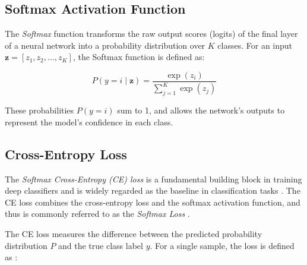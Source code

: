 

\subsection{Softmax Activation Function}
\label{sec:softmax}
The \textit{Softmax} function transforms the raw output scores (logits) of the final layer of a neural network into a probability distribution over \( K \) classes. For an input \( \mathbf{z} = [z_1, z_2, \dots, z_K] \), the Softmax function is defined as:

\begin{equation}
    \label{eq:softmax}
    P(y = i \mid \mathbf{z}) = \frac{\exp(z_i)}{\sum_{j=1}^{K} \exp(z_j)}
\end{equation}

\noindent These probabilities $P(y=i)$ sum to 1, and allows the network's outputs to represent the model's confidence in each class.

\subsection{Cross-Entropy Loss}
\label{sec:ce_loss}
The \emph{Softmax Cross-Entropy (CE) loss} is a fundamental building block in training deep classifiers and is widely regarded as the baseline in classification tasks \cite{zhang2023deep, cs231n, pytorch_crossentropy}. The CE loss combines the cross-entropy loss and the softmax activation function, and thus is commonly referred to as the \emph{Softmax Loss} \cite{zhang2023dive,Goodfellow-et-al-2016,zhang2023deep}. 

The CE loss measures the difference between the predicted probability distribution $P$ and the true class label $y$. For a single sample, the loss is defined as \cite{zhang2023dive,cs231n}:

